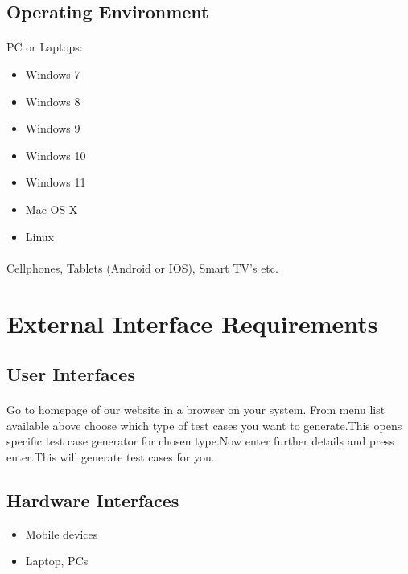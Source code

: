 \documentclass{article}
\begin{document}
\subsection{Operating Environment}
\paragraph{}
PC or Laptops:
\begin{itemize}
    \item Windows 7
    \item Windows 8
    \item Windows 9
    \item Windows 10
    \item Windows 11
    \item Mac OS X
    \item Linux
\end{itemize}
\paragraph{}
Cellphones, Tablets (Android or IOS), Smart TV's etc.


\section{External Interface Requirements}
\subsection{User Interfaces}
\paragraph{}
Go to homepage of our website in a browser on your system. From menu list available
above choose which type of test cases you want to generate.This opens specific test
case generator for chosen type.Now enter further details and press enter.This will
generate test cases for you.

\subsection{Hardware Interfaces}
\begin{itemize}
    \item Mobile devices
    \item Laptop, PCs
\end{itemize}
\end{document}
